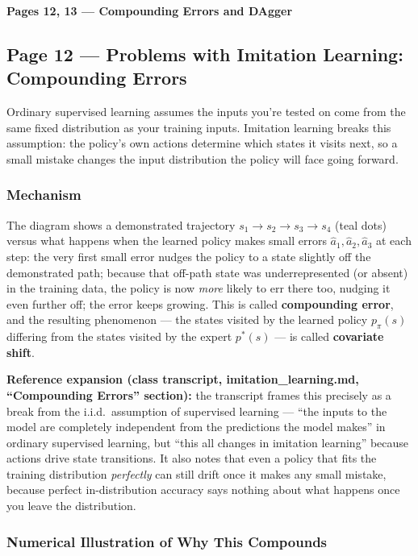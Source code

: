 \bigskip

\textbf{Pages 12, 13 --- Compounding Errors and DAgger}

\subsection*{Page 12 --- Problems with Imitation Learning: Compounding Errors}

Ordinary supervised learning assumes the inputs you're tested on come from the same fixed distribution as your training inputs. Imitation learning breaks this assumption: the policy's own actions determine which states it visits next, so a small mistake changes the input distribution the policy will face going forward.

\subsubsection*{Mechanism}

The diagram shows a demonstrated trajectory $s_1 \to s_2 \to s_3 \to s_4$ (teal dots) versus what happens when the learned policy makes small errors $\hat a_1, \hat a_2, \hat a_3$ at each step: the very first small error nudges the policy to a state slightly off the demonstrated path; because that off-path state was underrepresented (or absent) in the training data, the policy is now \emph{more} likely to err there too, nudging it even further off; the error keeps growing. This is called \textbf{compounding error}, and the resulting phenomenon --- the states visited by the learned policy $p_\pi(s)$ differing from the states visited by the expert $p^*(s)$ --- is called \textbf{covariate shift}.

\textbf{Reference expansion (class transcript, imitation\_learning.md, ``Compounding Errors'' section):} the transcript frames this precisely as a break from the i.i.d.\ assumption of supervised learning --- ``the inputs to the model are completely independent from the predictions the model makes'' in ordinary supervised learning, but ``this all changes in imitation learning'' because actions drive state transitions. It also notes that even a policy that fits the training distribution \emph{perfectly} can still drift once it makes any small mistake, because perfect in-distribution accuracy says nothing about what happens once you leave the distribution.

\subsubsection*{Numerical Illustration of Why This Compounds}

